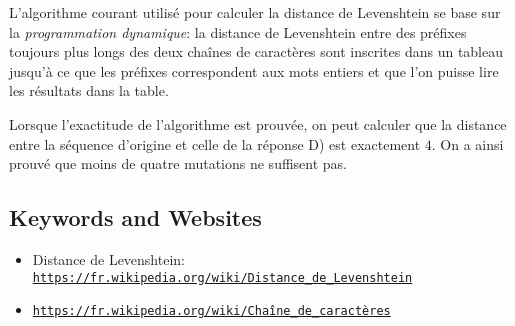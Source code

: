 \documentclass[a4paper,11pt]{report}
\newcommand{\BrochureUrlText}[1]{\texttt{#1}}
\begin{document}
L’algorithme courant utilisé pour calculer la distance de Levenshtein se base sur la \emph{programmation dynamique}: la distance de Levenshtein entre des préfixes toujours plus longs des deux chaînes de caractères sont inscrites dans un tableau jusqu’à ce que les préfixes correspondent aux mots entiers et que l’on puisse lire les résultats dans la table.

Lorsque l’exactitude de l’algorithme est prouvée, on peut calculer que la distance entre la séquence d’origine et celle de la réponse D) est exactement $4$. On a ainsi prouvé que moins de quatre mutations ne suffisent pas.

{\raggedright

\subsection*{Keywords and Websites}

\begin{itemize}
  \item Distance de Levenshtein: \href{https://fr.wikipedia.org/wiki/Distance_de_Levenshtein}{\BrochureUrlText{https://fr.wikipedia.org/wiki/Distance\_de\_Levenshtein}}
  \item \href{https://fr.wikipedia.org/wiki/Cha\%C3\%AEne_de_caract\%C3\%A8res}{\BrochureUrlText{https://fr.wikipedia.org/wiki/Chaîne\_de\_caractères}}
\end{itemize}


}
\end{document}
